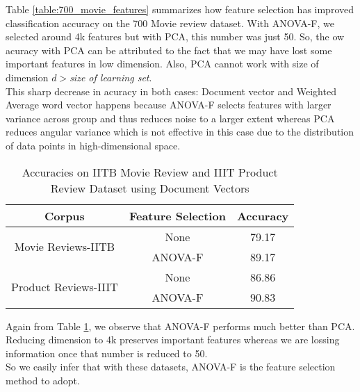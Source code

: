 Table \ref{table:700_movie_features} summarizes how feature selection has improved classification accuracy on the 700 Movie review dataset. With ANOVA-F, we selected around 4k features but with PCA, this number was just 50. So, the ow acuracy with PCA can be attributed to the fact that we may have lost some important features in low dimension. Also, PCA cannot work with size of dimension $d>$\emph{size of learning set}.\\
This sharp decrease in acuracy in both cases: Document vector and Weighted Average word vector happens because ANOVA-F selects features with larger variance across group and thus reduces noise to a larger extent whereas PCA reduces angular variance which is not effective in this case due to the distribution of data points in high-dimensional space.

\begin{table}[h!]
\centering
\begin{tabular}{|c|c|c|}
\hline
\textbf{Corpus} & \textbf{Feature Selection} & \textbf{Accuracy} \\ \hline
\multirow{2}{*}{Movie Reviews-IITB}   & None    & 79.17 \\ \cline{2-3} 
                                      & ANOVA-F & 89.17 \\ \hline
\multirow{2}{*}{Product Reviews-IIIT} & None    & 86.86 \\ \cline{2-3} 
                                      & ANOVA-F & 90.83 \\ \hline
\end{tabular}
\caption {Accuracies on IITB Movie Review and IIIT Product Review Dataset using Document Vectors}
\label{table:review_features}
\end{table}
Again from Table \ref{table:review_features}, we observe that ANOVA-F performs much better than PCA. Reducing dimension to 4k preserves important features whereas we are lossing information once that number is reduced to 50.\\
So we easily infer that with these datasets, ANOVA-F is the feature selection method to adopt.
